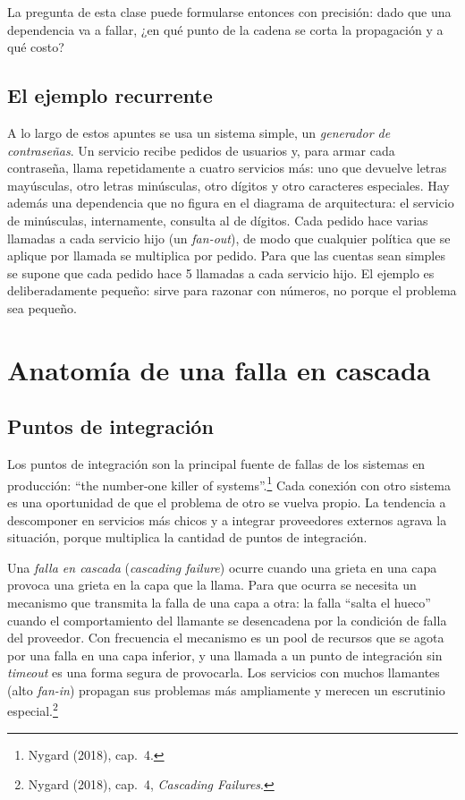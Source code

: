 \documentclass[variant=apuntes,cover=institutional,mode=screen]{ua-engineering-v6-article}
\begin{document}
La pregunta de esta clase puede formularse entonces con precisión: dado que una dependencia va a fallar, ¿en qué punto de la cadena se corta la propagación y a qué costo?

\subsection{El ejemplo recurrente}

A lo largo de estos apuntes se usa un sistema simple, un \emph{generador de contraseñas}. Un servicio recibe pedidos de usuarios y, para armar cada contraseña, llama repetidamente a cuatro servicios más: uno que devuelve letras mayúsculas, otro letras minúsculas, otro dígitos y otro caracteres especiales. Hay además una dependencia que no figura en el diagrama de arquitectura: el servicio de minúsculas, internamente, consulta al de dígitos. Cada pedido hace varias llamadas a cada servicio hijo (un \emph{fan-out}), de modo que cualquier política que se aplique por llamada se multiplica por pedido. Para que las cuentas sean simples se supone que cada pedido hace 5 llamadas a cada servicio hijo. El ejemplo es deliberadamente pequeño: sirve para razonar con números, no porque el problema sea pequeño.

\section{Anatomía de una falla en cascada}

\subsection{Puntos de integración}

Los puntos de integración son la principal fuente de fallas de los sistemas en producción: ``the number-one killer of systems''.\footnote{Nygard (2018), cap.~4.} Cada conexión con otro sistema es una oportunidad de que el problema de otro se vuelva propio. La tendencia a descomponer en servicios más chicos y a integrar proveedores externos agrava la situación, porque multiplica la cantidad de puntos de integración.

Una \emph{falla en cascada} (\emph{cascading failure}) ocurre cuando una grieta en una capa provoca una grieta en la capa que la llama. Para que ocurra se necesita un mecanismo que transmita la falla de una capa a otra: la falla ``salta el hueco'' cuando el comportamiento del llamante se desencadena por la condición de falla del proveedor. Con frecuencia el mecanismo es un pool de recursos que se agota por una falla en una capa inferior, y una llamada a un punto de integración sin \emph{timeout} es una forma segura de provocarla. Los servicios con muchos llamantes (alto \emph{fan-in}) propagan sus problemas más ampliamente y merecen un escrutinio especial.\footnote{Nygard (2018), cap.~4, \emph{Cascading Failures}.}
\end{document}

